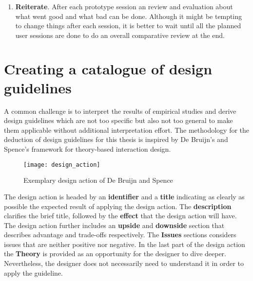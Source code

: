 \begin{enumerate}
	\item \textbf{Reiterate}. After each prototype session an review and evaluation about what went good and what bad can be done. Although it might be tempting to change things after each session, it is better to wait until all the planned user sessions are done to do an overall comparative review at the end.
\end{enumerate}

\section{Creating a catalogue of design guidelines}

A common challenge is to interpret the results of empirical studies and derive design guidelines which are not too specific but also not too general to make them applicable without additional interpretation effort. The methodology for the deduction of design guidelines for this thesis is inspired by De Bruijn's and Spence's framework for theory-based interaction design. 

\begin{figure}[h]
	\centering
	\texttt{[image: design\_action]}
	\caption{Exemplary design action of De Bruijn and Spence \cite{de2008new}}
	\label{fig:designaction} %
\end{figure}

The design action is headed by an \textbf{identifier} and a \textbf{title} indicating as clearly as possible the expected result of applying the design action. The \textbf{description} clarifies the brief title, followed by the \textbf{effect} that the design action will have. The design action further includes an \textbf{upside} and \textbf{downside} section that describes advantage and trade-offs respectively. The \textbf{Issues} sections considers issues that are neither positive nor negative. In the last part of the design action the \textbf{Theory} is provided as an opportunity for the designer to dive deeper. Nevertheless, the designer does not necessarily need to understand it in order to apply the guideline.

